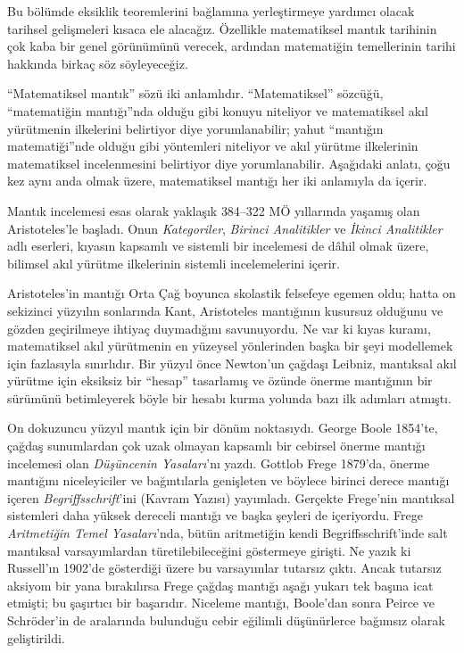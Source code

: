 \documentclass[../../../include/open-logic-section]{subfiles}
\begin{document}


Bu bölümde eksiklik teoremlerini bağlamına yerleştirmeye yardımcı olacak
tarihsel gelişmeleri kısaca ele alacağız. Özellikle matematiksel mantık
tarihinin çok kaba bir genel görünümünü verecek, ardından matematiğin
temellerinin tarihi hakkında birkaç söz söyleyeceğiz.

\begin{digress}
  ``Matematiksel mantık'' sözü iki anlamlıdır. ``Matematiksel'' sözcüğü,
  ``matematiğin mantığı''nda olduğu gibi konuyu niteliyor ve matematiksel
  akıl yürütmenin ilkelerini belirtiyor diye yorumlanabilir; yahut
  ``mantığın matematiği''nde olduğu gibi yöntemleri niteliyor ve akıl
  yürütme ilkelerinin matematiksel incelenmesini belirtiyor diye
  yorumlanabilir. Aşağıdaki anlatı, çoğu kez aynı anda olmak üzere,
  matematiksel mantığı her iki anlamıyla da içerir.
\end{digress}

Mantık incelemesi esas olarak yaklaşık 384--322 \textsc{MÖ} yıllarında yaşamış olan
Aristoteles'le başladı. Onun \emph{Kategoriler}, \emph{Birinci Analitikler}
ve \emph{İkinci Analitikler} adlı eserleri, kıyasın kapsamlı ve sistemli bir
incelemesi de dâhil olmak üzere, bilimsel akıl yürütme ilkelerinin sistemli
incelemelerini içerir.

Aristoteles'in mantığı Orta Çağ boyunca skolastik felsefeye egemen oldu;
hatta on sekizinci yüzyılın sonlarında Kant, Aristoteles mantığının kusursuz
olduğunu ve gözden geçirilmeye ihtiyaç duymadığını savunuyordu. Ne var ki
kıyas kuramı, matematiksel akıl yürütmenin en yüzeysel yönlerinden başka bir
şeyi modellemek için fazlasıyla sınırlıdır. Bir yüzyıl önce Newton'un çağdaşı
Leibniz, mantıksal akıl yürütme için eksiksiz bir ``hesap'' tasarlamış ve
özünde önerme mantığının bir sürümünü betimleyerek böyle bir hesabı kurma
yolunda bazı ilk adımları atmıştı.

On dokuzuncu yüzyıl mantık için bir dönüm noktasıydı. George Boole 1854'te,
çağdaş sunumlardan çok uzak olmayan kapsamlı bir cebirsel önerme mantığı
incelemesi olan \emph{Düşüncenin Yasaları}'nı yazdı. Gottlob Frege 1879'da,
önerme mantığını niceleyiciler ve bağıntılarla genişleten ve böylece birinci
derece mantığı içeren \emph{Begriffsschrift}'ini (Kavram Yazısı) yayımladı.
Gerçekte Frege'nin mantıksal sistemleri daha yüksek dereceli mantığı ve
başka şeyleri de içeriyordu. Frege \emph{Aritmetiğin Temel Yasaları}'nda,
bütün aritmetiğin kendi Begriffsschrift'inde salt mantıksal varsayımlardan
türetilebileceğini göstermeye girişti. Ne yazık ki Russell'ın 1902'de
gösterdiği üzere bu varsayımlar tutarsız çıktı. Ancak tutarsız aksiyom bir
yana bırakılırsa Frege çağdaş mantığı aşağı yukarı tek başına icat etmişti;
bu şaşırtıcı bir başarıdır. Niceleme mantığı, Boole'dan sonra Peirce ve
Schr\"oder'in de aralarında bulunduğu cebir eğilimli düşünürlerce bağımsız
olarak geliştirildi.
\end{document}
